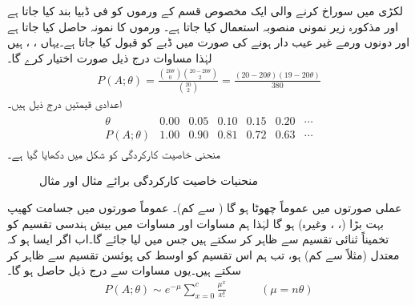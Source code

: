 \quad
لکڑی میں سوراخ کرنے والی ایک مخصوص قسم کے ورموں کو  فی ڈبیا بند کیا جاتا ہے اور مذکورہ زیر نمونی منصوبہ استعمال کیا جاتا ہے۔ ورموں کا نمونہ حاصل کیا جاتا ہے اور دونوں ورمے غیر عیب دار ہونے کی صورت میں ڈبے کو قبول کیا جاتا ہے۔یہاں ، ،  ہیں لہٰذا مساوات  درج ذیل صورت اختیار کرے گا۔
\begin{align*}
P(A;\theta)=\frac{\binom{20\theta}{0}\binom{20-20\theta}{2}}{\binom{20}{2}}=\frac{(20-20\theta)(19-20\theta)}{380}
\end{align*}
اعدادی قیمتیں درج ذیل ہیں۔
\begin{align*}
\begin{array}{ccccccc}
\theta&0.00&0.05&0.10&0.15&0.20&\cdots\\
\hline
P(A;\theta)&1.00&0.90&0.81&0.72&0.63&\cdots
\end{array}
\end{align*}
منحنی خاصیت کارکردگی کو شکل  میں دکھایا گیا ہے۔
\begin{figure}
\centering
{}
\caption{منحنیات خاصیت کارکردگی برائے مثال  اور مثال }
\label{شکل_شماریات_منحنی_خاصیت_کارکردگی}
\end{figure}
عملی صورتوں میں عموماً   چھوٹا ہو گا ( سے کم)۔ عموماً صورتوں میں جسامت کھیپ  بہت بڑا (، ، وغیرہ) ہو گا لہٰذا ہم مساوات  اور  مساوات  میں بیش ہندسی تقسیم  کو تخمیناً  ثنائی تقسیم سے ظاہر کر سکتے ہیں جس میں  لیا جائے گا۔اب اگر  ایسا ہو کہ  معتدل (مثلاً  سے کم) ہو،  تب ہم اس تقسیم کو   اوسط کی  پوئسن تقسیم سے ظاہر کر سکتے ہیں۔یوں مساوات  سے  درج ذیل حاصل ہو گا۔
\begin{align}\label{مساوات_شماریات_نسبت_عیب_دار_پ}
P(A;\theta)\sim e^{-\mu} \sum_{x=0}^{c} \frac{\mu^x}{x!}\quad\quad\quad (\mu=n\theta)
\end{align}

